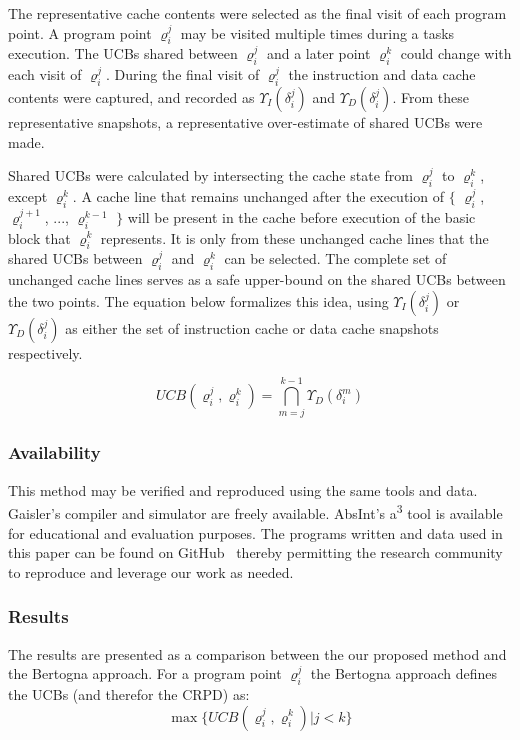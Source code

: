 The representative cache contents were selected as the final visit of
each program point. A program point ${\varrho_i^j}$ may be visited multiple
times during a tasks execution. The UCBs shared between ${\varrho_i^j}$ and a
later point ${\varrho_i^k}$ could change with each visit of ${\varrho_i^j}$. During
the final visit of ${\varrho_i^j}$ the instruction and data cache contents
were captured, and recorded as ${\Upsilon_I(\delta_i^j)}$ and ${\Upsilon_D(\delta_i^j)}$. 
From these representative snapshots, a representative over-estimate of shared
UCBs were made.

Shared UCBs were calculated by intersecting the cache state from ${\varrho_i^j}$
to ${\varrho_i^k}$, except ${\varrho_i^k}$. A cache line that remains unchanged after
the execution of $\{$ ${\varrho_i^j}$, ${\varrho_i^{j+1}}$, ..., ${\varrho_i^{k-1}}$
$\}$ will be present in the cache before execution of the basic block that ${\varrho_i^k}$
represents. It is only from these unchanged cache lines that the shared UCBs
between ${\varrho_i^j}$ and ${\varrho_i^k}$ can be selected. The complete set of
unchanged cache lines serves as a safe upper-bound on the shared UCBs
between the two points. The equation below formalizes this idea, using
${\Upsilon_I(\delta_i^j)}$ or ${\Upsilon_D(\delta_i^j)}$ as either the set of instruction 
cache or data cache snapshots respectively.
\vspace{-20pt}
\begin{center}
  \begin{equation*}
    UCB(\varrho_i^j, \varrho_i^k) = \bigcap_{m=j}^{k-1} {\Upsilon_D(\delta_i^m)}
  \end{equation*}
\end{center}
\subsubsection{Availability}
This method may be verified and reproduced using the same tools and
data. Gaisler's compiler and simulator are freely available. AbsInt's
a\textsuperscript{3} tool is available for educational and evaluation
purposes. The programs written and data used in this paper can be
found on GitHub~\cite{tessler:14} thereby permitting the research community
to reproduce and leverage our work as needed.

\subsubsection{Results}
The results are presented as a comparison between the our proposed
method and the Bertogna approach. For a program point ${\varrho_i^j}$ the
Bertogna \cite{bertogna:11} approach defines the UCBs (and therefor the CRPD) as:
\begin{equation*}
  \max\{ UCB(\varrho_i^j, \varrho_i^k) \vert j < k \}
\end{equation*}

